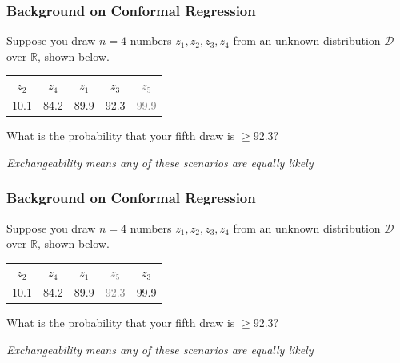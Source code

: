\documentclass[handout]{beamer}
\begin{document}
\begin{frame}
    \frametitle{Background on Conformal Regression \cite{lei2018distribution}}

    Suppose you draw $n=4$ numbers $z_1, z_2, z_3, z_4$ from an unknown distribution $\mathcal{D}$ over $\mathbb{R}$, shown below.

    \vspace{3em}

    \begin{center}
    \begin{tabular}{ccccc}
    $z_2$ & $z_4$ & $z_1$ & $z_3$ & \textcolor{gray}{$z_5$} \\
    10.1 & 84.2 & 89.9 & 92.3 & \textcolor{gray}{99.9}
    \end{tabular}
    \end{center}
    
    \vspace{3em}

    What is the probability that your fifth draw is $\geq 92.3$? 

    \vspace{1em}

    \textit{Exchangeability means any of these scenarios are equally likely}

\end{frame}

\begin{frame}
    \frametitle{Background on Conformal Regression \cite{lei2018distribution}}

    Suppose you draw $n=4$ numbers $z_1, z_2, z_3, z_4$ from an unknown distribution $\mathcal{D}$ over $\mathbb{R}$, shown below.

    \vspace{3em}

    \begin{center}
    \begin{tabular}{ccccc}
    $z_2$ & $z_4$ & $z_1$ & \textcolor{gray}{$z_5$} & $z_3$ \\
    10.1 & 84.2 & 89.9 & \textcolor{gray}{92.3} & 99.9
    \end{tabular}
    \end{center}
    
    \vspace{3em}

    What is the probability that your fifth draw is $\geq 92.3$? 

    \vspace{1em}

    \textit{Exchangeability means any of these scenarios are equally likely}

\end{frame}
\end{document}
